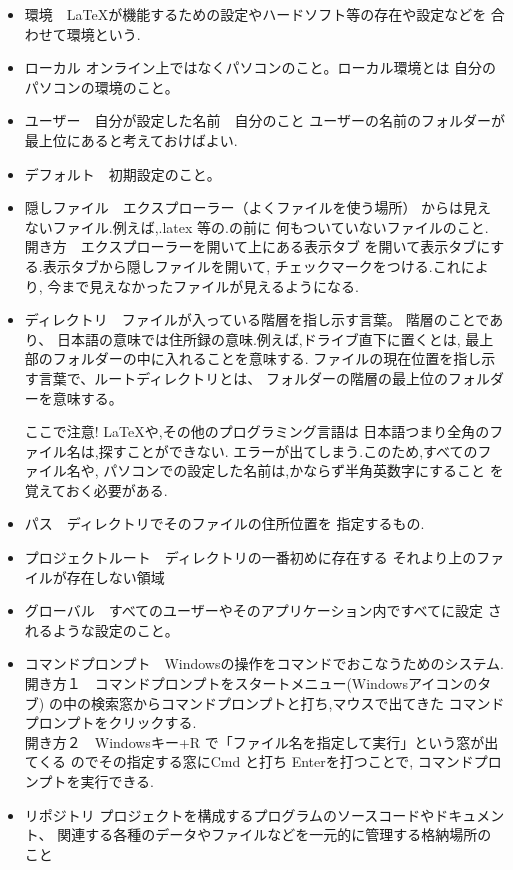 \documentclass{ltjsarticle}
\begin{document}
\begin{itemize}
  \item 環境　\LaTeX が機能するための設定やハードソフト等の存在や設定などを
        合わせて環境という.
  \item ローカル  オンライン上ではなくパソコンのこと。ローカル環境とは
        自分のパソコンの環境のこと。
  \item ユーザー　自分が設定した名前　自分のこと
        ユーザーの名前のフォルダーが最上位にあると考えておけばよい.
  \item デフォルト　初期設定のこと。
  \item 隠しファイル　エクスプローラー（よくファイルを使う場所）
        からは見えないファイル.例えば,.latex 等の.の前に
        何もついていないファイルのこと.
        開き方　エクスプローラーを開いて上にある表示タブ
        を開いて表示タブにする.表示タブから隠しファイルを開いて,
        チェックマークをつける.これにより,
        今まで見えなかったファイルが見えるようになる.

  \item ディレクトリ　ファイルが入っている階層を指し示す言葉。
        階層のことであり、
        日本語の意味では住所録の意味.例えば,ドライブ直下に置くとは,
        最上部のフォルダーの中に入れることを意味する.
        ファイルの現在位置を指し示す言葉で、ルートディレクトリとは、
        フォルダーの階層の最上位のフォルダーを意味する。


        ここで注意! LaTeXや,その他のプログラミング言語は
        日本語つまり全角のファイル名は,探すことができない.
        エラーが出てしまう.このため,すべてのファイル名や,
        パソコンでの設定した名前は,かならず半角英数字にすること
        を覚えておく必要がある.
  \item パス　ディレクトリでそのファイルの住所位置を
        指定するもの.
  \item プロジェクトルート　ディレクトリの一番初めに存在する
        それより上のファイルが存在しない領域
  \item グローバル　すべてのユーザーやそのアプリケーション内ですべてに設定
        されるような設定のこと。
  \item コマンドプロンプト　Windowsの操作をコマンドでおこなうためのシステム.\\
        開き方１　コマンドプロンプトをスタートメニュー(Windowsアイコンのタブ)
        の中の検索窓からコマンドプロンプトと打ち,マウスで出てきた
        コマンドプロンプトをクリックする.\\
        開き方２　Windowsキー+R で「ファイル名を指定して実行」という窓が出てくる
        のでその指定する窓にCmd と打ち Enterを打つことで,
        コマンドプロンプトを実行できる.
  \item リポジトリ
        プロジェクトを構成するプログラムのソースコードやドキュメント、
         関連する各種のデータやファイルなどを一元的に管理する格納場所のこと

\end{itemize}
\end{document}
